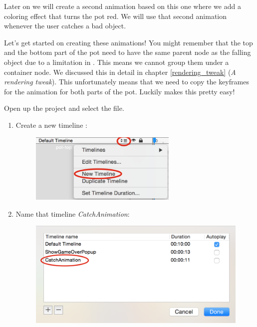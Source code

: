 Later on we will create a second animation based on this one where we add a
coloring effect that turns the pot red. We will use that second animation
whenever the user catches a bad object.

Let's get started on creating these animations! You might remember that the top
and the bottom part of the pot need to have the same parent node as the falling
object due to a limitation in \cocos{}. This means we cannot group them under
a container node. We discussed this in detail in chapter \ref{rendering_tweak}
(\textit{A rendering tweak}). This unfortunately means that we need to copy the
keyframes for the animation for both parts of the pot. Luckily \SB{} makes this
pretty easy!
\begin{leftbar}
Open up the \SB{} project and select the  file. 
\begin{enumerate}
  \item Create a new timeline :
  \begin{figure}[H]
  \centering
  \includegraphics[width=200pt]{images/Chapter9/timeline_new.png}
  \end{figure} 
 
  \item Name that timeline \textit{CatchAnimation}: 
  \begin{figure}[H]
  \centering
  \includegraphics[width=300pt]{images/Chapter9/rename_timeline.png}
  \end{figure}
  

\end{enumerate}
\end{leftbar}
